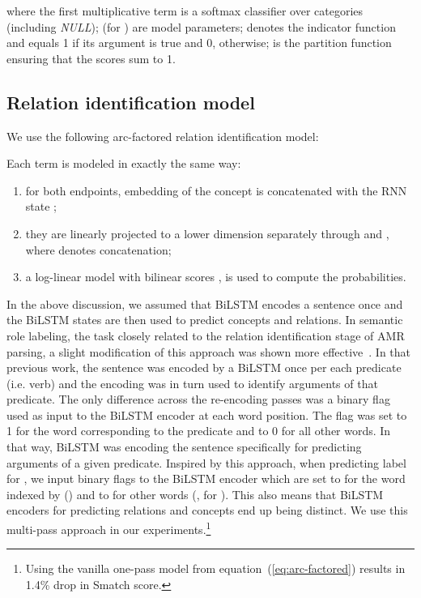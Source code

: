 \documentclass[11pt,a4paper]{article}
\begin{document}
where the first multiplicative term is a softmax classifier over categories (including {\it NULL});  (for ) are model parameters;  denotes the indicator function and equals 1 if its argument is true and 0, otherwise;  is the partition function ensuring that the scores sum to 1. 

\subsection{Relation identification model}
\label{sect:rel-mod}

We use the following arc-factored relation identification model:

Each term is modeled in exactly the same way: 
\begin{enumerate}
\item for both endpoints, embedding of the concept  is concatenated with the RNN state ; 
\item they are linearly projected to a lower dimension separately through  and , where  denotes concatenation; 
\item a log-linear 
model with bilinear scores , 
is used to compute the probabilities.
\end{enumerate}

In the above discussion, we assumed that BiLSTM 
encodes a sentence once and the BiLSTM states are then used to predict concepts and relations. In semantic role labeling, the task
closely related to the relation identification stage of AMR parsing, a slight modification of this approach was shown more effective~\cite{zhou2015end,marcheggiani-frolov-titov:2017:CoNLL}. In that previous work, the sentence was encoded by a BiLSTM once per each predicate (i.e. verb) and the encoding was in turn used to identify arguments of that predicate. The only difference across the re-encoding passes was 
a binary flag used as input to the BiLSTM encoder at each word position. The flag was set to 1 for the word corresponding to the predicate and to 0 for all other words. In that way, BiLSTM was encoding the sentence specifically for predicting arguments of a given predicate.
Inspired by this approach, when predicting label  for , we input binary flags  to the BiLSTM encoder which are set to  for the word indexed by  () and to  for other words (, for ). 
This also means that BiLSTM encoders for predicting relations and concepts end up being distinct. 
We use this multi-pass approach in our experiments.\footnote{Using the vanilla one-pass model from equation~(\ref{eq:arc-factored}) results in 1.4\% drop in Smatch score.}
\end{document}
